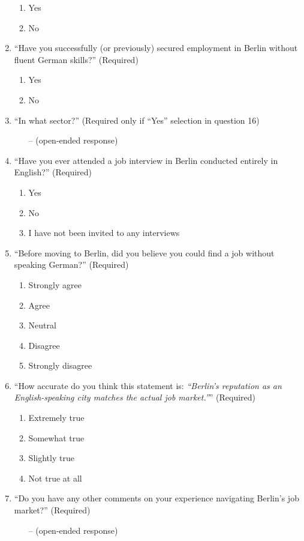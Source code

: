 \begin{enumerate}
	\begin{enumerate}
		\item Yes
		\item No
	\end{enumerate}
	\item ``Have you successfully (or previously) secured employment in Berlin without fluent German skills?'' (Required)
	\begin{enumerate}
		\item Yes
		\item No
	\end{enumerate}
	\item ``In what sector?'' (Required only if ``Yes'' selection in question 16)
	\begin{itemize}
		\item[--] (open-ended response)
	\end{itemize}
	\item ``Have you ever attended a job interview in Berlin conducted entirely in English?'' (Required)
	\begin{enumerate}
		\item Yes
		\item No
		\item I have not been invited to any interviews
	\end{enumerate}
	\item ``Before moving to Berlin, did you believe you could find a job without speaking German?'' (Required)
	\begin{enumerate}
		\item Strongly agree
		\item Agree
		\item Neutral
		\item Disagree
		\item Strongly disagree
	\end{enumerate}
	\item ``How accurate do you think this statement is: \textit{“Berlin’s reputation as an English-speaking city matches the actual job market.”}'' (Required)
	\begin{enumerate}
		\item Extremely true
		\item Somewhat true
		\item Slightly true
		\item Not true at all
	\end{enumerate}
	\item ``Do you have any other comments on your experience navigating Berlin’s job market?'' (Required)
	\begin{itemize}
		\item[--] (open-ended response)
	\end{itemize}
\end{enumerate}

